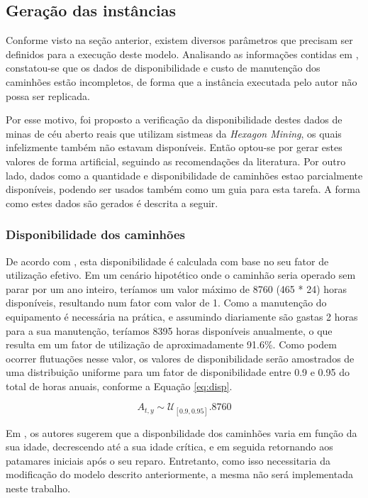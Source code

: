 \documentclass[conference]{IEEEtran}
\begin{document}
\subsection{Geração das instâncias}

Conforme visto na seção anterior, existem diversos parâmetros que precisam ser definidos para a execução deste modelo. Analisando as informações contidas em \cite{topal2010a}, constatou-se que os dados de disponibilidade e custo de manutenção dos caminhões estão incompletos, de forma que a instância executada pelo autor não possa ser replicada.

Por esse motivo, foi proposto a verificação da disponibilidade destes dados de minas de céu aberto reais que utilizam sistmeas da \textit{Hexagon Mining}, os quais infelizmente também não estavam disponíveis. Então optou-se por gerar estes valores de forma artificial, seguindo as recomendações da literatura. Por outro lado, dados como a quantidade e disponibilidade de caminhões estao parcialmente disponíveis, podendo ser usados também como um guia para esta tarefa. A forma como estes dados são gerados é descrita a seguir.

\subsubsection{Disponibilidade dos caminhões}
De acordo com \cite{topal2010a}, esta disponibilidade é calculada com base no seu fator de utilização efetivo. Em um cenário hipotético onde o caminhão seria operado sem parar por um ano inteiro, teríamos um valor máximo de 8760 (465 * 24) horas disponíveis, resultando num fator com valor de 1. Como a manutenção do equipamento é necessária na prática, e assumindo diariamente são gastas 2 horas para a sua manutenção, teríamos 8395 horas disponíveis anualmente, o que resulta em um fator de utilização de aproximadamente 91.6\%. Como podem ocorrer flutuações nesse valor, os valores de disponibilidade serão amostrados de uma distribuição uniforme para um fator de disponibilidade entre 0.9 e 0.95 do total de horas anuais, conforme a Equação \ref{eq:disp}.

\begin{equation}
	A_{t,y} \sim \mathcal{U}_{[0.9, 0.95]}. 8760
	\label{eq:disp}
\end{equation}

Em \cite{nakousi2018}, os autores sugerem que a disponbilidade dos caminhões varia em função da sua idade, decrescendo até a sua idade crítica, e em seguida retornando aos patamares iniciais após o seu reparo. Entretanto, como isso necessitaria da modificação do modelo descrito anteriormente, a mesma não será implementada neste trabalho.
\end{document}
